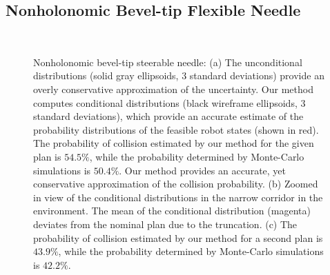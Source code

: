 \subsection{Nonholonomic Bevel-tip Flexible Needle}

\begin{figure}[!t]
{\,} \hfill
\hfill
{}
\hfill
{}
{\,} \hfill
\vspace*{-5pt}
\caption{Nonholonomic bevel-tip steerable needle: (a) The unconditional distributions (solid gray ellipsoids, $3$ standard deviations) provide an overly conservative approximation of the uncertainty. Our method computes conditional distributions (black wireframe ellipsoids, $3$ standard deviations), which provide an accurate estimate of the probability distributions of the feasible robot states (shown in red). The probability of collision estimated by our method for the given plan is $54.5\%$, while the probability determined by Monte-Carlo simulations is $50.4\%$. Our method provides an accurate, yet conservative approximation of the collision probability. (b) Zoomed in view of the conditional distributions in the narrow corridor in the environment. The mean of the conditional distribution (magenta) deviates from the nominal plan due to the truncation. (c) The probability of collision estimated by our method for a second plan is $43.9\%$, while the probability determined by Monte-Carlo simulations is $42.2\%$.}

\end{figure}
